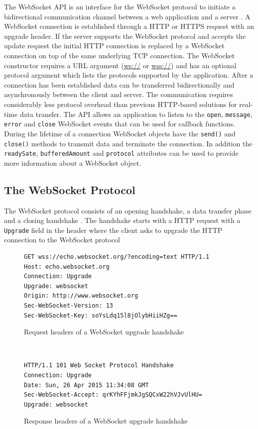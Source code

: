 The WebSocket API is an interface for the WebSocket protocol to initiate a bidirectional communication channel between a web application and a server \cite{hickson2011websocket}. A WebSocket connection is established through a HTTP or HTTPS request with an upgrade header. If the server supports the WebSocket protocol and accepts the update request the initial HTTP connection is replaced by a WebSocket connection on top of the same underlying TCP connection. The WebSocket constructor requires a URL argument (\url{ws://} or \url{wss://}) and has an optional protocol argument which lists the protocols supported by the application. After a connection has been established data can be transferred bidirectionally and asynchronously between the client and server. The communication requires considerably less protocol overhead than previous HTTP-based solutions for real-time data transfer. The API allows an application to listen to the \texttt{open}, \texttt{message}, \texttt{error} and \texttt{close} WebSocket events that can be used for callback functions. During the lifetime of a connection WebSocket objects have the \texttt{send()} and \texttt{close()} methods to transmit data and terminate the connection. In addition the \texttt{readySate}, \texttt{bufferedAmount} and \texttt{protocol} attributes can be used to provide more information about a WebSocket object. 

\subsection{The WebSocket Protocol}

The WebSocket protocol consists of an opening handshake, a data transfer phase and a closing handshake \cite{fette2011websocket}. The handshake starts with a HTTP request with a \texttt{Upgrade} field in the header where the client asks to upgrade the HTTP connection to the WebSocket protocol
\\
\begin{figure}[h!]
\begin{Verbatim}[fontsize=\small]
GET wss://echo.websocket.org/?encoding=text HTTP/1.1
Host: echo.websocket.org
Connection: Upgrade
Upgrade: websocket
Origin: http://www.websocket.org
Sec-WebSocket-Version: 13
Sec-WebSocket-Key: soYsLdq15l8jOlybHiiHZg==
\end{Verbatim}
\caption{Request headers of a WebSocket upgrade handshake}
\label{request-headers}
\end{figure}
\ \\
\begin{figure}[h!]
\begin{Verbatim}[fontsize=\small]
HTTP/1.1 101 Web Socket Protocol Handshake
Connection: Upgrade
Date: Sun, 26 Apr 2015 11:34:08 GMT
Sec-WebSocket-Accept: qrKYhFFjmkJgSQCxW22hVJvUlHU=
Upgrade: websocket
\end{Verbatim}
\caption{Response headers of a WebSocket upgrade handshake}
\label{response-headers}
\end{figure}

